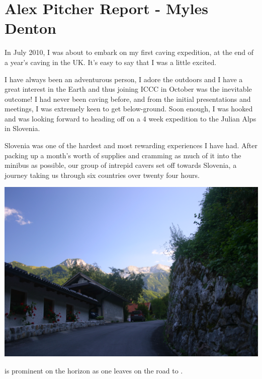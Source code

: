 \section{Alex Pitcher Report - Myles Denton}



In July 2010, I was about to embark on my first caving expedition, at the end of a year's caving in the UK. It's easy to say that I was a little excited.


I have always been an adventurous person, I adore the outdoors and I have a great interest in the
Earth and thus joining ICCC in October was the inevitable outcome! I had never been caving before,
and from the initial presentations and meetings, I was extremely keen to get below-ground. Soon
enough, I was hooked and was looking forward to heading off on a 4 week expedition to the Julian
Alps in Slovenia.


Slovenia was one of the hardest and most rewarding experiences I have had. After packing up
a month's worth of supplies and cramming as much of it into the minibus as possible, our group of
intrepid cavers set off towards Slovenia, a journey taking us through six countries over twenty four
hours.


\begin{pagefigure}
\checkoddpage \ifoddpage \forcerectofloat \else \forceversofloat \fi
   \centering
\includegraphics[width = \textwidth]{2010/expo_stories/20100731-14-22-42 - Tharatorn Supasiti - IMG_6366 --orig.jpg}
\caption{\protect{} is prominent on the horizon as one leaves \protect{} on the road to \protect{}. } \label{leaving tolmin}
\end{pagefigure}

